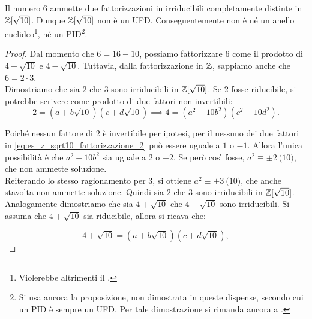 \begin{example}
    Il numero $6$ ammette due fattorizzazioni in irriducibili
    completamente distinte in $\mathbb{Z}[\sqrt{10}]$. Dunque
    $\mathbb{Z}[\sqrt{10}]$ non è un UFD. Conseguentemente non è né un anello
    euclideo\footnote{Violerebbe altrimenti il .}, né un
    PID\footnote{Si usa ancora la proposizione, non dimostrata
    in queste dispense, secondo cui un PID è sempre un UFD. Per
    tale dimostrazione si rimanda ancora a \cite[pp.~124-126]{di2013algebra}.}.
\end{example}    

\begin{proof}
    Dal momento che $6=16-10$,
    possiamo fattorizzare $6$ come il prodotto
    di $4+\sqrt{10}$ e $4-\sqrt{10}$. Tuttavia, dalla
    fattorizzazione in $\mathbb Z$, sappiamo anche
    che $6=2 \cdot 3$. \\
    
    Dimostriamo che sia $2$ che $3$ sono irriducibili
    in $\mathbb Z[\sqrt{10}]$. Se $2$ fosse riducibile,
    si potrebbe scrivere come prodotto
    di due fattori non invertibili: \\
    
    \begin{equation}
        \label{eq:es_z_sqrt10_fattorizzazione_2}
        2 = (a + b\sqrt{10})(c + d\sqrt{10}) \implies 4 = (a^2 - 10b^2)(c^2 - 10d^2).
    \end{equation}
    
    \vskip 0.1in
    
    Poiché nessun fattore di $2$ è invertibile per ipotesi, per il
     nessuno dei due
    fattori in \eqref{eq:es_z_sqrt10_fattorizzazione_2} può essere uguale a $1$ o $-1$.
    Allora l'unica possibilità è che $a^2 - 10b^2$ sia uguale a $2$ o
    $-2$. Se però così fosse, $a^2 \equiv \pm 2 \pod{10}$, che
    non ammette soluzione. \\
    
    Reiterando lo stesso ragionamento per $3$,
    si ottiene $a^2 \equiv \pm 3 \pod{10}$, che anche
    stavolta non ammette soluzione. Quindi sia $2$ che
    $3$ sono irriducibili in $\mathbb Z[\sqrt{10}]$. \\
    
    Analogamente dimostriamo che sia $4+\sqrt{10}$ che
    $4-\sqrt{10}$ sono irriducibili. Si assuma che
    $4+\sqrt{10}$ sia riducibile, allora si ricava che:
    
    \[ 4+\sqrt{10} = (a + b\sqrt{10})(c + d\sqrt{10}), \]
    

\end{proof}
